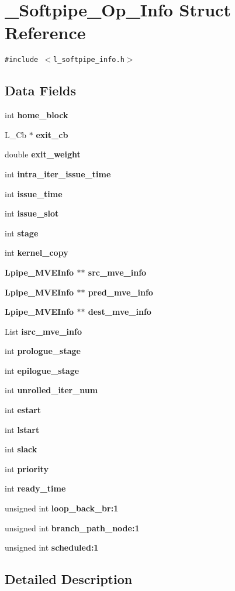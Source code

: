 \section{\_\-Softpipe\_\-Op\_\-Info Struct Reference}
\label{struct__Softpipe__Op__Info}
{\tt \#include $<$l\_\-softpipe\_\-info.h$>$}

\subsection*{Data Fields}
\begin{CompactItemize}
\item 
int \bf{home\_\-block}
\item 
L\_\-Cb $\ast$ \bf{exit\_\-cb}
\item 
double \bf{exit\_\-weight}
\item 
int \bf{intra\_\-iter\_\-issue\_\-time}
\item 
int \bf{issue\_\-time}
\item 
int \bf{issue\_\-slot}
\item 
int \bf{stage}
\item 
int \bf{kernel\_\-copy}
\item 
\bf{Lpipe\_\-MVEInfo} $\ast$$\ast$ \bf{src\_\-mve\_\-info}
\item 
\bf{Lpipe\_\-MVEInfo} $\ast$$\ast$ \bf{pred\_\-mve\_\-info}
\item 
\bf{Lpipe\_\-MVEInfo} $\ast$$\ast$ \bf{dest\_\-mve\_\-info}
\item 
List \bf{isrc\_\-mve\_\-info}
\item 
int \bf{prologue\_\-stage}
\item 
int \bf{epilogue\_\-stage}
\item 
int \bf{unrolled\_\-iter\_\-num}
\item 
int \bf{estart}
\item 
int \bf{lstart}
\item 
int \bf{slack}
\item 
int \bf{priority}
\item 
int \bf{ready\_\-time}
\item 
unsigned int \bf{loop\_\-back\_\-br}:1
\item 
unsigned int \bf{branch\_\-path\_\-node}:1
\item 
unsigned int \bf{scheduled}:1
\end{CompactItemize}


\subsection{Detailed Description}




